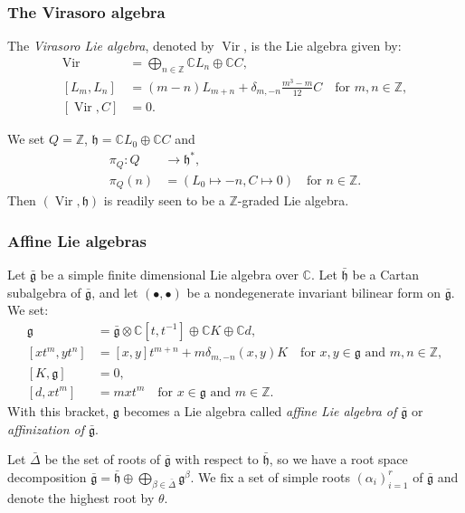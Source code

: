 \documentclass{beamer}
\DeclareMathOperator{\Vir}{Vir}
\begin{document}
\begin{frame}
  \frametitle{The Virasoro algebra}
  The \emph{Virasoro Lie algebra}, denoted by $\Vir$, is the Lie algebra given by:
  \begin{align*}
    \Vir &= \bigoplus_{n \in \mathbb{Z}}\mathbb{C}L_n \oplus \mathbb{C}C, \\
    [L_m, L_n] &= (m - n)L_{m + n} + \delta_{m, -n}\frac{m^3 - m}{12}C \quad \text{for $m, n \in \mathbb{Z}$}, \\
    [\Vir, C] &= 0.
  \end{align*}

  We set $Q = \mathbb{Z}$, $\mathfrak{h} = \mathbb{C}L_0 \oplus \mathbb{C}C$ and
  \begin{align*}
    \pi_Q: Q &\to \mathfrak{h}^*, \\
    \pi_Q(n) &= (L_0 \mapsto -n, C \mapsto 0) \quad \text{for $n \in \mathbb{Z}$}.
  \end{align*}
  Then $(\Vir, \mathfrak{h})$ is readily seen to be a $\mathbb{Z}$-graded Lie algebra.
\end{frame}

\begin{frame}
  \frametitle{Affine Lie algebras}
  Let $\bar{\mathfrak{g}}$ be a simple finite dimensional Lie algebra over $\mathbb{C}$.
  Let $\bar{\mathfrak{h}}$ be a Cartan subalgebra of $\bar{\mathfrak{g}}$, and let $(\bullet, \bullet)$ be a nondegenerate invariant bilinear form on $\bar{\mathfrak{g}}$.
  We set:
  \begin{align*}
    \mathfrak{g} &= \bar{\mathfrak{g}} \otimes \mathbb{C}[t, t^{-1}] \oplus \mathbb{C}K \oplus \mathbb{C}d, \\
    [xt^m, yt^n] &= [x, y]t^{m + n} + m\delta_{m, -n}(x, y)K \quad \text{for $x, y \in \mathfrak{g}$ and $m, n \in \mathbb{Z}$},  \\
    [K, \mathfrak{g}] &= 0, \\
    [d, xt^m] &= mxt^m \quad \text{for $x \in \mathfrak{g}$ and $m \in \mathbb{Z}$}.
  \end{align*}
  With this bracket, $\mathfrak{g}$ becomes a Lie algebra called \emph{affine Lie algebra of $\bar{\mathfrak{g}}$} or \emph{affinization of $\bar{\mathfrak{g}}$}.

  Let $\bar{\Delta}$ be the set of roots of $\bar{\mathfrak{g}}$ with respect to $\bar{\mathfrak{h}}$, so we have a root space decomposition $\bar{\mathfrak{g}} = \bar{\mathfrak{h}} \oplus \bigoplus_{\beta \in \bar{\Delta}}\mathfrak{g}^{\beta}$.
  We fix a set of simple roots $(\alpha_i)_{i = 1}^r$ of $\bar{\mathfrak{g}}$ and denote the highest root by $\theta$.
\end{frame}
\end{document}
